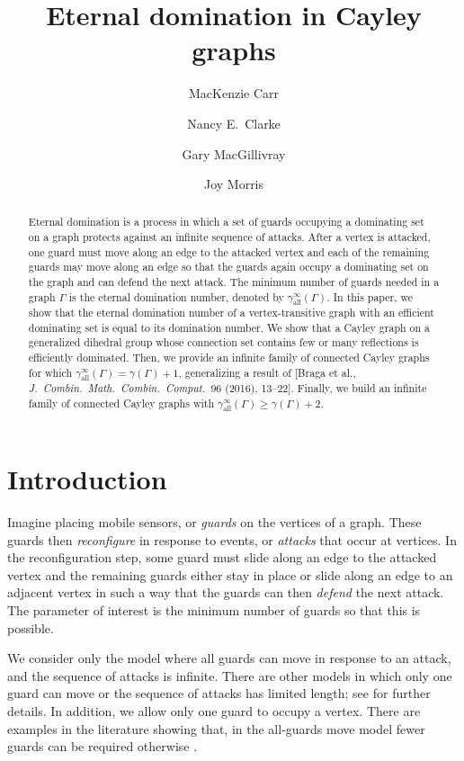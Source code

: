\documentclass{amsart}
\title{Eternal domination in Cayley graphs}
\author{MacKenzie Carr}
\author{Nancy E.~Clarke}
\author{Gary MacGillivray}
\author{Joy Morris}
\theoremstyle{remark}
\theoremstyle{definition}
\newcommand{\etdom}{\gamma_{\mathrm{all}}^\infty}
\begin{document}
\begin{abstract}
    Eternal domination is a process in which a set of guards occupying a dominating set on a graph protects against an infinite sequence of attacks. After a vertex is attacked, one guard must move along an edge to the attacked vertex and each of the remaining guards may move along an edge so that the guards again occupy a dominating set on the graph and can defend the next attack. The minimum number of guards needed in a graph $\Gamma$ is the eternal domination number, denoted by $\etdom(\Gamma)$. In this paper, we show that the eternal domination number of a vertex-transitive graph with an efficient dominating set is equal to its domination number. We show that a Cayley graph on a generalized dihedral group whose connection set contains few or many reflections is efficiently dominated. Then, we provide an infinite family of connected Cayley graphs for which $\etdom(\Gamma) = \gamma(\Gamma)+1$, generalizing a result of [Braga et al., \emph{J.~Combin.~Math.~Combin.~Comput.~}96 (2016), 13--22]. Finally, we build an infinite family of connected Cayley graphs with $\etdom(\Gamma) \geq \gamma(\Gamma)+2$. 
\end{abstract}


\maketitle

\section{Introduction}
Imagine placing mobile sensors, or \textit{guards} on the vertices of a graph.  These guards then \textit{reconfigure} in response to events, or \textit{attacks} that occur at vertices.  In the reconfiguration step, some guard must slide along an edge to the attacked vertex and the remaining guards either stay in place or slide along an edge to an adjacent vertex in such a way that the guards can then \textit{defend} the next attack.
The parameter of interest is the minimum number of guards so that this is possible.  

We consider only the model where all guards can move in response to an attack, and the sequence of attacks is infinite.  There are other models in which only one guard can move or the sequence of attacks has limited length;   see \cite{KM16, W23, V24} for further details.
In addition, we allow only one guard to occupy a vertex.  There are examples in the literature showing that, in the all-guards move model fewer guards can be required otherwise \cite{FGMO18, W23}.
\end{document}
